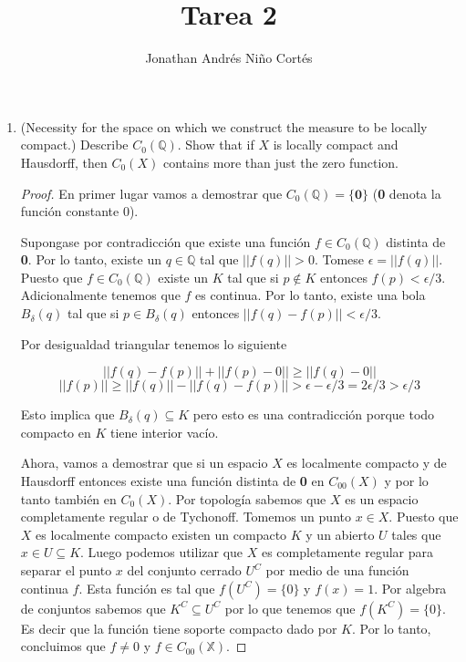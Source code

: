 \documentclass[letter,twoside,12pt]{article}
\title{Tarea 2}
\author{Jonathan Andrés Niño Cortés}
\begin{document}
\maketitle

\begin{enumerate}
\item (Necessity for the space on which we construct the measure to be locally compact.) Describe $C_0(\mathbb{Q})$. Show that if $X$ is locally compact and Hausdorff, then $C_0(X)$ contains more than just the zero function.
\begin{proof}

En primer lugar vamos a demostrar que $C_0(\mathbb{Q}) = \{\textbf{0}\}$ (\textbf{0} denota la función constante 0).

Supongase por contradicción que existe una función $ f \in C_0(\mathbb{Q})$ distinta de \textbf{0}. Por lo tanto, existe un $q \in \mathbb{Q}$ tal que $||f(q)||>0$. Tomese $\epsilon = ||f(q)||$. Puesto que  $ f \in C_0(\mathbb{Q})$ existe un $ K $ tal que si $p \not \in K$ entonces $f(p)< \epsilon/3$. Adicionalmente tenemos que $f$ es continua. Por lo tanto, existe una bola $B_\delta(q) $ tal que si $p \in B_\delta(q) $ entonces $||f(q)-f(p)||<\epsilon/3$.

Por desigualdad triangular tenemos lo siguiente

$$ ||f(q)-f(p)||+||f(p)-0|| \geq ||f(q)-0|| $$
$$ ||f(p)|| \geq ||f(q)||-||f(q)-f(p)|| > \epsilon - \epsilon/3 = 2\epsilon/3 >\epsilon/3 $$

Esto implica que $B_\delta(q) \subseteq K $ pero esto es una contradicción porque todo compacto en $ K $ tiene interior vacío.

Ahora, vamos a demostrar que si un espacio $X$ es localmente compacto y de Hausdorff entonces existe una función distinta de \textbf{0} en $ C_{00}(X) $ y por lo tanto también en $C_{0}(X)$. Por topología sabemos que $X$ es un espacio completamente regular o de Tychonoff. Tomemos un punto $x \in X$. Puesto que $ X $ es localmente compacto existen un compacto $K$ y un abierto $U$ tales que $ x \in U \subseteq K $. Luego podemos utilizar que $X$ es completamente regular para separar el punto $x$ del conjunto cerrado $U^C$ por medio de una función continua $f$. Esta función es tal que $ f(U^C) = \{0\}$ y $f(x) = 1 $. Por algebra de conjuntos sabemos que $ K^C \subseteq U^C $ por lo que tenemos que $ f(K^C) = \{0\}$. Es decir que la función tiene soporte compacto dado por $K$. Por lo tanto, concluimos que $ f \not = 0 $ y $ f \in C_{00}(\mathbb{X}) $.
\end{proof}


\end{enumerate}
\end{document}
